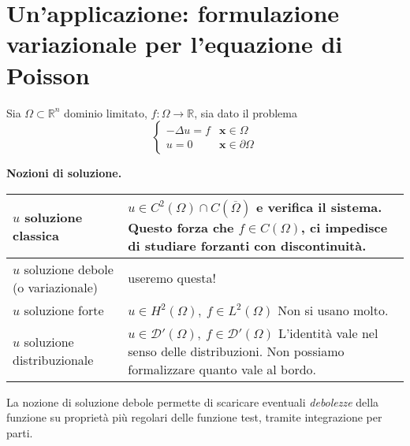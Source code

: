 \documentclass[10pt,a4paper,twoside,openright]{book}
\newcommand{\x}{\mathbf{x}}
\begin{document}
\chapter{Un'applicazione: formulazione variazionale per l'equazione di Poisson}

Sia $\displaystyle \Omega \subset \mathbb{R}^{n}$ dominio limitato, $\displaystyle f:\Omega \rightarrow \mathbb{R}$, sia dato il problema
\begin{equation}
	\begin{cases}
		-\Delta u=f & \x \in \Omega          \\
		u=0         & \x \in \partial \Omega 
	\end{cases}
	\label{eq:af-problema-poisson}
\end{equation}
\vspace*{0.5cm}
\begin{center}
	\textbf{Nozioni di soluzione.}
\end{center}
\begin{center}
	{\renewcommand{\arraystretch}{2.8}%
	\begin{tabular}{|l|l|}
		\hline 
		$u$ soluzione classica                               & \makecell[l]{$\displaystyle u\in C^{2}( \Omega ) \cap C(\overline{\Omega })$ e verifica il sistema. \\Questo forza che $\displaystyle f\in C( \Omega )$, ci impedisce di studiare\\forzanti con discontinuità.} \\
		\hline 
		\makecell[l]{$u$ soluzione debole\\(o variazionale)} & useremo questa! \\
		\hline 
		$u$ soluzione forte                                  & \makecell[l]{$\displaystyle u\in H^{2}( \Omega ) ,\ f\in L^{2}( \Omega )$                           \\Non si usano molto.} \\
		\hline 
		$u$ soluzione distribuzionale                        & \makecell[l]{$\displaystyle u\in \mathcal{D} '( \Omega ) ,\ f\in \mathcal{D} '( \Omega )$           \\L'identità vale nel senso delle distribuzioni.\\Non possiamo formalizzare quanto vale al bordo.} \\
		\hline
	\end{tabular}
	}
\end{center}
\vspace*{0.5cm}
La nozione di soluzione debole permette di scaricare eventuali \textit{debolezze} della funzione su proprietà più regolari delle funzione test, tramite integrazione per parti. 
\end{document}
